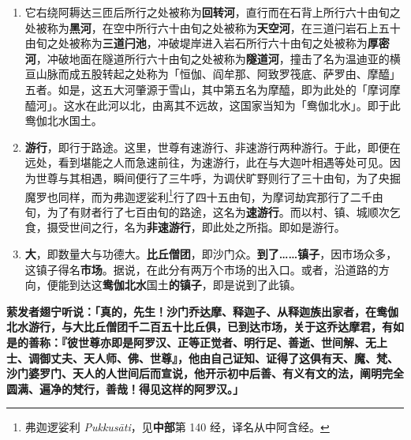\begin{enumerate}
\item 它右绕阿耨达三匝后所行之处被称为\textbf{回转河}，直行而在石背上所行六十由旬之处被称为\textbf{黑河}，在空中所行六十由旬之处被称为\textbf{天空河}，在三道闩岩石上五十由旬之处被称为\textbf{三道闩池}，冲破堤岸进入岩石所行六十由旬之处被称为\textbf{厚密河}，冲破地面在隧道所行六十由旬之处被称为\textbf{隧道河}，撞击了名为温迪亚的横亘山脉而成五股转起之处称为「恒伽、阎牟那、阿致罗筏底、萨罗由、摩醯」五者。如是，这五大河肇源于雪山，其中第五名为摩醯，即为此处的「摩诃摩醯河」。这水在此河以北，由离其不远故，这国家当知为「鸯伽北水」。即于此鸯伽北水国土。
\item \textbf{游行}，即行于路途。这里，世尊有速游行、非速游行两种游行。于此，即便在远处，看到堪能之人而急速前往，为速游行，此在与大迦叶相遇等处可见。因为世尊与其相遇，瞬间便行了三牛呼，为调伏旷野则行了三十由旬，为了央掘魔罗也同样，而为弗迦逻娑利\footnote{弗迦逻娑利 \textit{Pukkusāti}，见\textbf{中部}第 140 经，译名从中阿含经。}行了四十五由旬，为摩诃劫宾那行了二千由旬，为了有财者行了七百由旬的路途，这名为\textbf{速游行}。而以村、镇、城顺次乞食，摄受世间之行，名为\textbf{非速游行}，即此处之所指。即如是游行。
\item \textbf{大}，即数量大与功德大。\textbf{比丘僧团}，即沙门众。\textbf{到了……镇子}，因市场众多，这镇子得名\textbf{市场}。据说，在此分有两万个市场的出入口。或者，沿道路的方向，便能到达这\textbf{鸯伽北水}国土\textbf{的镇子}，即是说到了此镇。\end{enumerate}

\textbf{萦发者翅宁听说：「真的，先生！沙门乔达摩、释迦子、从释迦族出家者，在鸯伽北水游行，与大比丘僧团千二百五十比丘俱，已到达市场，关于这乔达摩君，有如是的善称：『彼世尊亦即是阿罗汉、正等正觉者、明行足、善逝、世间解、无上士、调御丈夫、天人师、佛、世尊』，他由自己证知、证得了这俱有天、魔、梵、沙门婆罗门、天人的人世间后而宣说，他开示初中后善、有义有文的法，阐明完全圆满、遍净的梵行，善哉！得见这样的阿罗汉。」}

